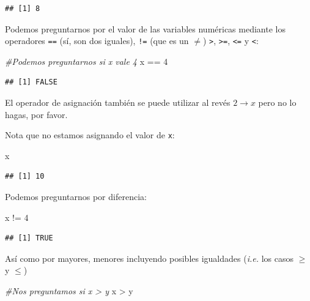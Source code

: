 \documentclass[]{tufte-book}
\newenvironment{Shaded}{}{}
\newcommand{\CommentTok}[1]{\textcolor[rgb]{0.38,0.63,0.69}{\textit{#1}}}
\newcommand{\DecValTok}[1]{\textcolor[rgb]{0.25,0.63,0.44}{#1}}
\newcommand{\NormalTok}[1]{#1}
\newcommand{\SpecialCharTok}[1]{\textcolor[rgb]{0.25,0.44,0.63}{#1}}
\begin{document}
\begin{verbatim}
## [1] 8
\end{verbatim}

Podemos preguntarnos por el valor de las variables numéricas mediante
los operadores \texttt{==} (sí, son dos iguales), \texttt{!=} (que es un
\(\neq\)) \texttt{\textgreater{}}, \texttt{\textgreater{}=},
\texttt{\textless{}=} y \texttt{\textless{}}:

\begin{Shaded}
\begin{Highlighting}[]
\CommentTok{\#Podemos preguntarnos si x vale 4}
\NormalTok{x }\SpecialCharTok{==} \DecValTok{4}
\end{Highlighting}
\end{Shaded}

\begin{verbatim}
## [1] FALSE
\end{verbatim}

\begin{marginfigure}
El operador de asignación también se puede utilizar al revés
\(2 \rightarrow x\) pero no lo hagas, por favor.
\end{marginfigure}

Nota que no estamos asignando el valor de \texttt{x}:

\begin{Shaded}
\begin{Highlighting}[]
\NormalTok{x}
\end{Highlighting}
\end{Shaded}

\begin{verbatim}
## [1] 10
\end{verbatim}

Podemos preguntarnos por diferencia:

\begin{Shaded}
\begin{Highlighting}[]
\NormalTok{x }\SpecialCharTok{!=} \DecValTok{4} 
\end{Highlighting}
\end{Shaded}

\begin{verbatim}
## [1] TRUE
\end{verbatim}

Así como por mayores, menores incluyendo posibles igualdades
(\emph{i.e.} los casos \(\geq\) y \(\leq\))

\begin{Shaded}
\begin{Highlighting}[]
\CommentTok{\#Nos preguntamos si x \textgreater{} y}
\NormalTok{x }\SpecialCharTok{\textgreater{}}\NormalTok{ y}
\end{Highlighting}
\end{Shaded}
\end{document}
